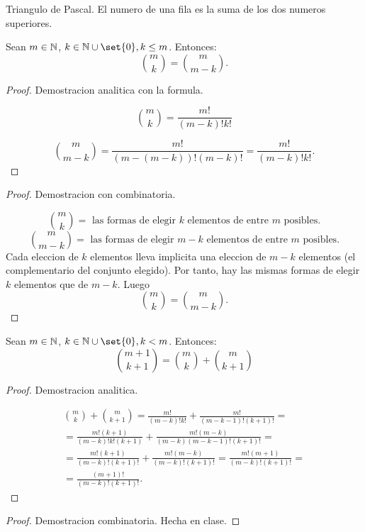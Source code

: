 Triangulo de Pascal. El numero de una fila es la suma de los dos numeros superiores.

\begin{theorem}
	Sean \(m \in \mathbb{N} \), \(k \in \N \cup \set{0}, k \leq m \). Entonces:
	\[
		\binom{m }{k }= \binom{m }{m - k }.
	\]
\end{theorem}
\begin{proof}
	Demostracion analitica con la formula.
	
	\[\binom{m }{k } = \frac{m! }{(m-k)! k! }\]
	
	\[
		\binom{m }{m - k } = \frac{m! }{(m - (m-k))! (m-k)! } = \frac{m! }{(m-k)! k! }.
	\]
\end{proof}
\begin{proof}
	Demostracion con combinatoria.
	
	\[
		\binom{m }{k } = \text{ las formas de elegir } k \text{ elementos de entre } m \text{ posibles.}
	\]
	\[
		\binom{m }{m-k } = \text{ las formas de elegir } m - k \text{ elementos de entre } m \text{ posibles.}
	\]
	Cada eleccion de \(k \) elementos lleva implicita una eleccion de \(m - k \) elementos (el complementario del conjunto elegido). Por tanto, hay las mismas formas de elegir \(k \) elementos que de \(m-  k\). Luego
	\[
		\binom{m }{k } = \binom{m }{m - k }.
	\]
\end{proof}

\begin{theorem}
	Sean \(m \in \mathbb{N} \), \(k \in \N \cup \set{0}, k < m \). Entonces:
	\[
		\binom{m+1 }{k + 1 } = \binom{m }{k } + \binom{m }{k + 1 }
	\]
\end{theorem}
\begin{proof}
	Demostracion analitica.
	
	\begin{multline*}
		\binom{m }{k }+ \binom{m }{k + 1} = \frac{m! }{(m-k)! k! } + \frac{m! }{(m-k-1)! (k+1)! } = \\
		= \frac{m! (k+1)}{(m-k)!k! (k+1)} + \frac{m! (m-k)}{(m-k)(m-k-1)!(k+1)! } = \\
		= \frac{m!(k+1)}{(m-k)!(k+1)!} + \frac{m!(m-k)}{(m-k)!(k+1)!} = \frac{m!(m+1)}{(m-k)!(k+1)!} = \\ = \boxed{\frac{(m+1)!}{(m-k)!(k+1)!}}.
	\end{multline*}
\end{proof}
\begin{proof}
	Demostracion combinatoria. Hecha en clase.
\end{proof}

